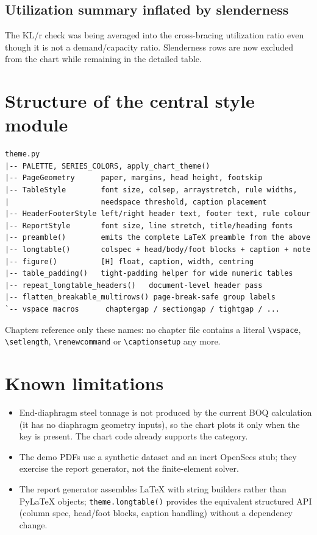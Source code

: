 \documentclass[11pt,a4paper]{article}
\newcommand{\code}[1]{\texttt{\small #1}}
\begin{document}
\subsection*{Utilization summary inflated by slenderness}

The KL/r check was being averaged into the cross-bracing utilization ratio even
though it is not a demand/capacity ratio. Slenderness rows are now excluded from
the chart while remaining in the detailed table.

\section{Structure of the central style module}

\begin{verbatim}
theme.py
|-- PALETTE, SERIES_COLORS, apply_chart_theme()
|-- PageGeometry      paper, margins, head height, footskip
|-- TableStyle        font size, colsep, arraystretch, rule widths,
|                     needspace threshold, caption placement
|-- HeaderFooterStyle left/right header text, footer text, rule colour
|-- ReportStyle       font size, line stretch, title/heading fonts
|-- preamble()        emits the complete LaTeX preamble from the above
|-- longtable()       colspec + head/body/foot blocks + caption + note
|-- figure()          [H] float, caption, width, centring
|-- table_padding()   tight-padding helper for wide numeric tables
|-- repeat_longtable_headers()   document-level header pass
|-- flatten_breakable_multirows() page-break-safe group labels
`-- vspace macros      chaptergap / sectiongap / tightgap / ...
\end{verbatim}

Chapters reference only these names: no chapter file contains a literal
\code{\textbackslash vspace}, \code{\textbackslash setlength},
\code{\textbackslash renewcommand} or \code{\textbackslash captionsetup} any more.

\section{Known limitations}

\begin{itemize}
  \item End-diaphragm steel tonnage is not produced by the current BOQ calculation
        (it has no diaphragm geometry inputs), so the chart plots it only when the
        key is present. The chart code already supports the category.
  \item The demo PDFs use a synthetic dataset and an inert OpenSees stub; they
        exercise the report generator, not the finite-element solver.
  \item The report generator assembles LaTeX with string builders rather than
        PyLaTeX objects; \code{theme.longtable()} provides the equivalent structured
        API (column spec, head/foot blocks, caption handling) without a dependency
        change.
\end{itemize}
\end{document}
